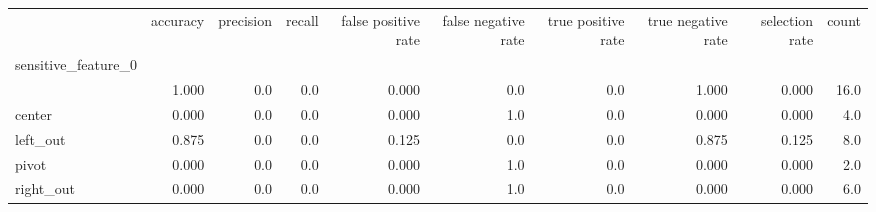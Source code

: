 \begin{tabular}{lrrrrrrrrr}
\toprule
{} &  accuracy &  precision &  recall &  false positive rate &  false negative rate &  true positive rate &  true negative rate &  selection rate &  count \\
sensitive\_feature\_0 &           &            &         &                      &                      &                     &                     &                 &        \\
\midrule
                    &     1.000 &        0.0 &     0.0 &                0.000 &                  0.0 &                 0.0 &               1.000 &           0.000 &   16.0 \\
center              &     0.000 &        0.0 &     0.0 &                0.000 &                  1.0 &                 0.0 &               0.000 &           0.000 &    4.0 \\
left\_out            &     0.875 &        0.0 &     0.0 &                0.125 &                  0.0 &                 0.0 &               0.875 &           0.125 &    8.0 \\
pivot               &     0.000 &        0.0 &     0.0 &                0.000 &                  1.0 &                 0.0 &               0.000 &           0.000 &    2.0 \\
right\_out           &     0.000 &        0.0 &     0.0 &                0.000 &                  1.0 &                 0.0 &               0.000 &           0.000 &    6.0 \\
\bottomrule
\end{tabular}
